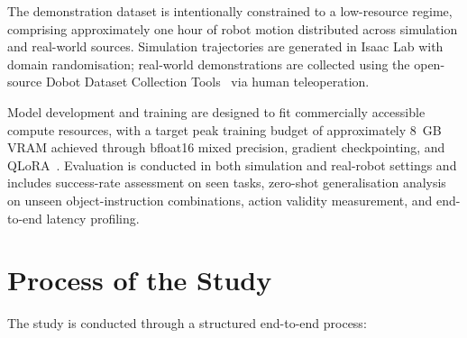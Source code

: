 The demonstration dataset is intentionally constrained to a low-resource regime,
comprising approximately one hour of robot motion distributed across simulation and
real-world sources. Simulation trajectories are generated in Isaac Lab with domain
randomisation; real-world demonstrations are collected using the open-source Dobot
Dataset Collection Tools~\cite{falightsk2025dobot} via human teleoperation.

Model development and training are designed to fit commercially accessible compute
resources, with a target peak training budget of approximately 8~GB VRAM achieved
through bfloat16 mixed precision, gradient checkpointing, and QLoRA~\cite{dettmers2023qlora}.
Evaluation is conducted in both simulation and real-robot settings and includes
success-rate assessment on seen tasks, zero-shot generalisation analysis on unseen
object-instruction combinations, action validity measurement, and end-to-end latency
profiling.



\section{Process of the Study}


\noindent The study is conducted through a structured end-to-end process:

